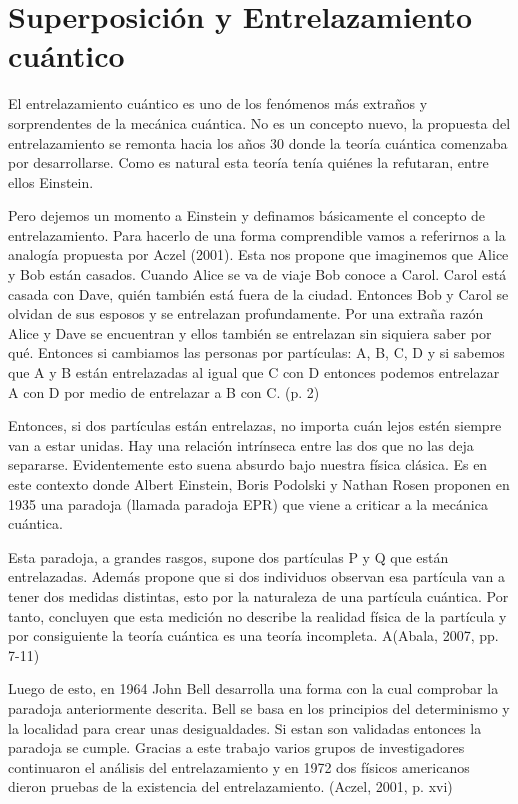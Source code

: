 \documentclass[11pt,a4paper]{article}
\begin{document}
\section*{Superposición y Entrelazamiento cuántico}
El entrelazamiento cuántico es uno de los fenómenos más extraños y sorprendentes de la mecánica cuántica. No es un concepto nuevo, la propuesta del entrelazamiento se remonta hacia los años 30 donde la teoría cuántica comenzaba por desarrollarse. Como es natural esta teoría tenía quiénes la refutaran, entre ellos Einstein.

Pero dejemos un momento a Einstein y definamos básicamente el concepto de entrelazamiento. Para hacerlo de una forma comprendible vamos a referirnos a la analogía propuesta por Aczel (2001). Esta nos propone que imaginemos que Alice y Bob están casados. Cuando Alice se va de viaje Bob conoce a Carol. Carol está casada con Dave, quién también está fuera de la ciudad. Entonces Bob y Carol se olvidan de sus esposos y se entrelazan profundamente. Por una extraña razón Alice y Dave se encuentran y ellos también se entrelazan sin siquiera saber por qué. Entonces si cambiamos las personas por partículas: A, B, C, D y si sabemos que A y B están entrelazadas al igual que C con D  entonces podemos entrelazar A con D por medio de entrelazar a B con C. (p. 2)

Entonces, si dos partículas están entrelazas, no importa cuán lejos estén siempre van a estar unidas. Hay una relación intrínseca entre las dos que no las deja separarse. Evidentemente esto suena absurdo bajo nuestra física clásica. Es en este contexto donde Albert Einstein, Boris Podolski y Nathan Rosen proponen en 1935 una paradoja (llamada paradoja EPR) que viene a criticar a la mecánica cuántica. 

Esta paradoja, a grandes rasgos, supone dos partículas P y Q que están entrelazadas. Además propone que si dos individuos observan esa partícula van a tener dos medidas distintas, esto por la naturaleza de una partícula cuántica. Por tanto, concluyen que esta medición no describe la realidad física de la partícula y por consiguiente la teoría cuántica es una teoría incompleta. A(Abala, 2007, pp. 7-11)

Luego de esto, en 1964 John Bell desarrolla una forma con la cual comprobar la paradoja anteriormente descrita. Bell se basa en los principios del determinismo y la localidad para crear unas desigualdades. Si estan son validadas entonces la paradoja se cumple. Gracias a este trabajo varios grupos de investigadores continuaron el análisis del entrelazamiento y en 1972 dos físicos americanos dieron pruebas de la existencia del entrelazamiento. (Aczel, 2001, p. xvi)
\end{document}
